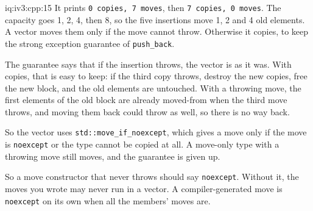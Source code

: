 \begin{solution}{iq:iv3:cpp:15}
It prints \texttt{0 copies, 7 moves}, then \texttt{7 copies, 0 moves}. The capacity goes 1, 2, 4, then 8, so the five insertions move 1, 2 and 4 old elements. A vector moves them only if the move cannot throw. Otherwise it copies, to keep the strong exception guarantee of \texttt{push\_back}.

The guarantee says that if the insertion throws, the vector is as it was. With copies, that is easy to keep: if the third copy throws, destroy the new copies, free the new block, and the old elements are untouched. With a throwing move, the first elements of the old block are already moved-from when the third move throws, and moving them back could throw as well, so there is no way back.

So the vector uses \texttt{std::move\_if\_noexcept}, which gives a move only if the move is \texttt{noexcept} or the type cannot be copied at all. A move-only type with a throwing move still moves, and the guarantee is given up.

So a move constructor that never throws should say \texttt{noexcept}. Without it, the moves you wrote may never run in a vector. A compiler-generated move is \texttt{noexcept} on its own when all the members' moves are.

\end{solution}

